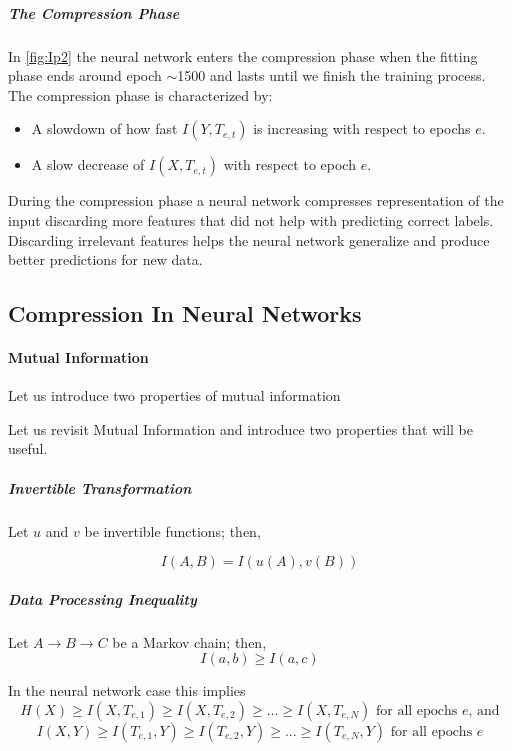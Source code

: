 \subparagraph{The Compression Phase} In \autoref{fig:Ip2} the neural network
enters the compression phase when the fitting phase ends around epoch $\sim$1500
and lasts until we finish the training process. The compression phase is
characterized by:
\begin{itemize}
  \item{
      A slowdown of how fast $I(Y, T_{e,t})$ is increasing with respect to epochs
      $e$. 
    }
  \item{
      A slow decrease of $I(X, T_{e,t})$ with respect to epoch $e$.
    }
\end{itemize}

During the compression phase a neural network compresses representation of the
input discarding more features that did not help with predicting correct labels.
Discarding irrelevant features helps the neural network generalize and produce
better predictions for new data. 

\subsection{Compression In Neural Networks}

\paragraph{Mutual Information} 
Let us introduce two properties of mutual information 

Let us revisit Mutual Information and introduce two properties that will be
useful.

\subparagraph{Invertible Transformation} 
Let $u$ and $v$ be invertible functions; then,

\begin{equation}
  I(A, B) = I(u(A), v(B))
\end{equation}

\subparagraph{Data Processing Inequality} 
Let $ A \rightarrow B \rightarrow C$ be a Markov chain; then,
\begin{equation}
  I(a,b) \geq I(a,c)
\end{equation}

In the neural network case this implies 
\begin{equation}
  H(X) \geq I(X,T_{e,1}) \geq I(X, T_{e,2}) \geq ... \geq I(X,T_{e,N}) 
  \text{ for all epochs } e \text{, and}
  \label{eq:dpiIneq1}
\end{equation}
\begin{equation}
  I(X, Y) \geq I(T_{e,1}, Y) \geq I(T_{e,2}, Y) \geq ... \geq I(T_{e,N}, Y) 
  \text{ for all epochs } e 
  \label{eq:dpiIneq2}
\end{equation}

